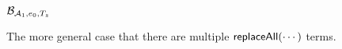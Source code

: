 \begin{example}
$\mathcal{B}_{\mathcal{A}_1, e_0,  T_{z}}$
\end{example}

The more general case that there are multiple $\mathsf{replaceAll}(\cdots)$ terms.



